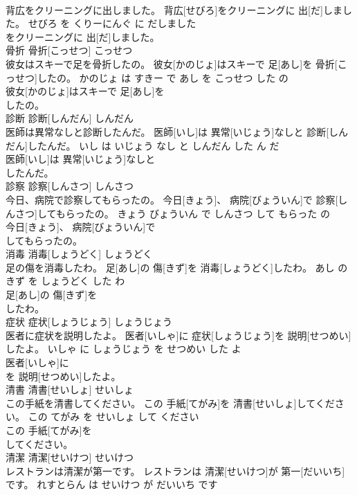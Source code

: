 \documentclass[8pt]{extreport}
\begin{document}
\begin{CJK}{UTF8}{min}
\\	背広をクリーニングに出しました。	背広[せびろ]をクリーニングに 出[だ]しました。	せびろ を くりーにんぐ に だしました	
\\	をクリーニングに 出[だ]しました。			
\\	骨折	骨折[こっせつ]	こっせつ	
\\	彼女はスキーで足を骨折したの。	彼女[かのじょ]はスキーで 足[あし]を 骨折[こっせつ]したの。	かのじょ は すきー で あし を こっせつ した の	
\\	彼女[かのじょ]はスキーで 足[あし]を
\\	したの。			
\\	診断	診断[しんだん]	しんだん	
\\	医師は異常なしと診断したんだ。	医師[いし]は 異常[いじょう]なしと 診断[しんだん]したんだ。	いし は いじょう なし と しんだん した ん だ	
\\	医師[いし]は 異常[いじょう]なしと
\\	したんだ。			
\\	診察	診察[しんさつ]	しんさつ	
\\	今日、病院で診察してもらったの。	今日[きょう]、 病院[びょういん]で 診察[しんさつ]してもらったの。	きょう びょういん で しんさつ して もらった の	
\\	今日[きょう]、 病院[びょういん]で
\\	してもらったの。			
\\	消毒	消毒[しょうどく]	しょうどく	
\\	足の傷を消毒したわ。	足[あし]の 傷[きず]を 消毒[しょうどく]したわ。	あし の きず を しょうどく した わ	
\\	足[あし]の 傷[きず]を
\\	したわ。			
\\	症状	症状[しょうじょう]	しょうじょう	
\\	医者に症状を説明したよ。	医者[いしゃ]に 症状[しょうじょう]を 説明[せつめい]したよ。	いしゃ に しょうじょう を せつめい した よ	
\\	医者[いしゃ]に
\\	を 説明[せつめい]したよ。			
\\	清書	清書[せいしょ]	せいしょ	
\\	この手紙を清書してください。	この 手紙[てがみ]を 清書[せいしょ]してください。	この てがみ を せいしょ して ください	
\\	この 手紙[てがみ]を
\\	してください。			
\\	清潔	清潔[せいけつ]	せいけつ	
\\	レストランは清潔が第一です。	レストランは 清潔[せいけつ]が 第一[だいいち]です。	れすとらん は せいけつ が だいいち です	

\end{CJK}
\end{document}
